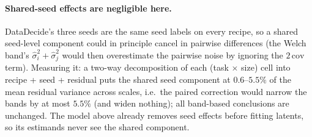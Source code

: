 \paragraph{Shared-seed effects are negligible here.}
DataDecide's three seeds are the same seed labels on every recipe, so a shared seed-level
component could in principle cancel in pairwise differences (the Welch band's
$\hat\sigma_i^2 + \hat\sigma_j^2$ would then overestimate the pairwise noise by ignoring the
$2\,\mathrm{cov}$ term). Measuring it: a two-way decomposition of each (task $\times$ size)
cell into recipe + seed + residual puts the shared seed component at $0.6$--$5.5\%$ of the
mean residual variance across scales, i.e.\ the paired correction would narrow the bands by at
most $5.5\%$ (and widen nothing); all band-based conclusions are unchanged. The model above
already removes seed effects before fitting latents, so its estimands never see the shared
component.

